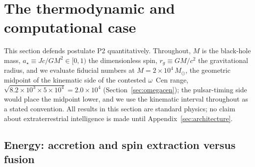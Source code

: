 \documentclass[11pt]{article}
\newcommand{\msun}{\ensuremath{M_\odot}}
\newcommand{\astar}{\ensuremath{a_\star}}
\begin{document}
\section{The thermodynamic and computational case}
\label{sec:thermo}

This section defends postulate P2 quantitatively. Throughout, $M$ is the black-hole mass, $\astar \equiv Jc/GM^{2} \in [0,1)$ the dimensionless spin, $r_{g} \equiv GM/c^{2}$ the gravitational radius, and we evaluate fiducial numbers at $M = 2\times10^{4}\,\msun$, the geometric midpoint of the kinematic side of the contested $\omega$~Cen range, $\sqrt{8.2\times10^{3} \times 5\times10^{4}} = 2.0\times10^{4}$ (Section~\ref{sec:omegacen}); the pulsar-timing side would place the midpoint lower, and we use the kinematic interval throughout as a stated convention. All results in this section are standard physics; no claim about extraterrestrial intelligence is made until Appendix~\ref{sec:architecture}.

\subsection{Energy: accretion and spin extraction versus fusion}
\label{sec:energy}
\end{document}
